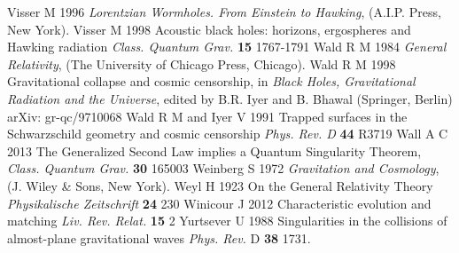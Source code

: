 \documentclass[12pt]{iopart}
\begin{document}
\begin{thebibliography}{999}
 Visser M 1996 {\it Lorentzian Wormholes. From Einstein to
Hawking}, (A.I.P. Press, New York).
 Visser M 1998 Acoustic black holes: horizons, ergospheres and Hawking radiation {\it Class. Quantum Grav.} {\bf 15} 1767-1791
 Wald R M 1984 {\it General Relativity}, (The University
of Chicago Press, Chicago).
 Wald R M 1998 Gravitational collapse and cosmic censorship, in {\it Black Holes, Gravitational Radiation and the Universe}, edited by B.R. Iyer and B. Bhawal (Springer, Berlin) arXiv: gr-qc/9710068%
 Wald R M and Iyer V 1991 Trapped surfaces in the Schwarzschild geometry and cosmic censorship {\it Phys. Rev. D} {\bf 44} R3719 %
 Wall A C 2013 The Generalized Second Law implies a Quantum Singularity Theorem, {\it Class. Quantum Grav.} {\bf 30} 165003
 Weinberg S 1972 {\it Gravitation and Cosmology}, (J. Wiley
\& Sons, New York).
 Weyl H 1923 On the General Relativity Theory {\it Physikalische Zeitschrift} {\bf 24} 230%
 Winicour J 2012 Characteristic evolution and matching {\it Liv. Rev. Relat.} {\bf 15} 2
 Yurtsever U 1988 Singularities in the collisions of almost-plane gravitational waves {\it Phys. Rev.} D {\bf 38} 1731.%
















\end{thebibliography}
\end{document}
